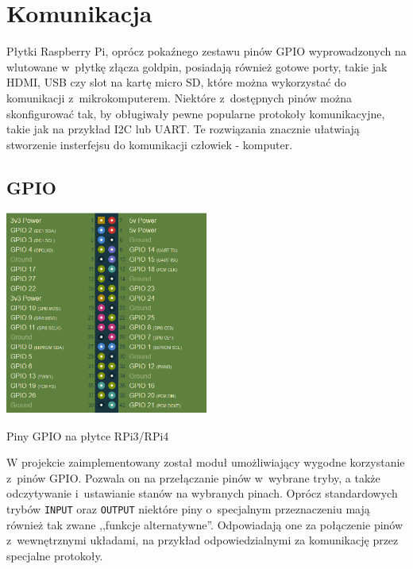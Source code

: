 \documentclass[shortabstract]{iithesis}
\begin{document}
\chapter{Komunikacja}
Płytki Raspberry Pi, oprócz pokaźnego zestawu pinów GPIO wyprowadzonych na wlutowane w~płytkę złącza goldpin, posiadają również gotowe porty, takie jak HDMI, USB czy slot na kartę micro SD, które można wykorzystać do komunikacji z~mikrokomputerem. Niektóre z~dostępnych pinów można skonfigurować tak, by obługiwały pewne popularne protokoły komunikacyjne, takie jak na przykład I2C lub UART. Te rozwiązania znacznie ułatwiają stworzenie insterfejsu do komunikacji człowiek - komputer.

\section{GPIO}
\begingroup
\centering
\includegraphics[width=0.5\textwidth]{gpio.png}
\captionsetup{type=figure}
\caption{Piny GPIO na płytce RPi3/RPi4}
\endgroup

W projekcie zaimplementowany został moduł umożliwiający wygodne korzystanie z~pinów GPIO. Pozwala on na przełączanie pinów w~wybrane tryby, a także odczytywanie i~ustawianie stanów na wybranych pinach. Oprócz standardowych trybów \texttt{INPUT} oraz \texttt{OUTPUT} niektóre piny o~specjalnym przeznaczeniu mają również tak zwane ,,funkcje alternatywne''. Odpowiadają one za połączenie pinów z~wewnętrznymi układami, na przykład odpowiedzialnymi za komunikację przez specjalne protokoły.
\end{document}
